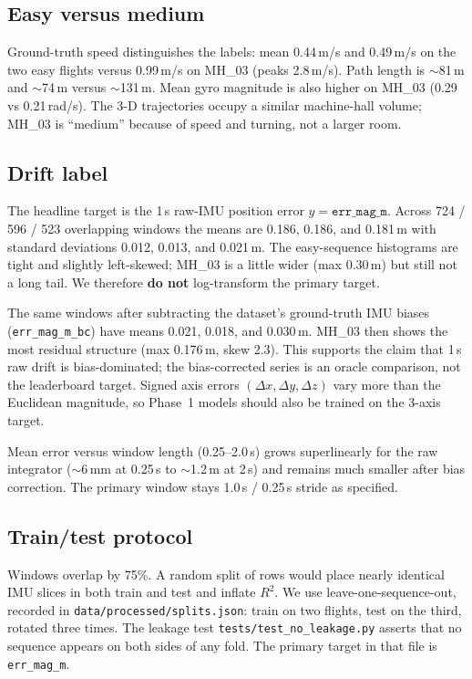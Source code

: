 \subsection{Easy versus medium}
Ground-truth speed distinguishes the labels: mean 0.44\,m/s and
0.49\,m/s on the two easy flights versus 0.99\,m/s on MH\_03 (peaks
2.8\,m/s). Path length is $\sim$81\,m and $\sim$74\,m versus $\sim$131\,m.
Mean gyro magnitude is also higher on MH\_03 (0.29 vs 0.21\,rad/s).
The 3-D trajectories occupy a similar machine-hall volume; MH\_03 is
``medium'' because of speed and turning, not a larger room.

\subsection{Drift label}
The headline target is the 1\,s raw-IMU position error $y=\texttt{err\_mag\_m}$.
Across 724 / 596 / 523 overlapping windows the means are 0.186, 0.186,
and 0.181\,m with standard deviations 0.012, 0.013, and 0.021\,m.
The easy-sequence histograms are tight and slightly left-skewed; MH\_03
is a little wider (max 0.30\,m) but still not a long tail. We therefore
\textbf{do not} log-transform the primary target.

The same windows after subtracting the dataset's ground-truth IMU biases
(\texttt{err\_mag\_m\_bc}) have means 0.021, 0.018, and 0.030\,m. MH\_03
then shows the most residual structure (max 0.176\,m, skew 2.3). This
supports the claim that 1\,s raw drift is bias-dominated; the
bias-corrected series is an oracle comparison, not the leaderboard
target. Signed axis errors $({\Delta}x,{\Delta}y,{\Delta}z)$ vary more
than the Euclidean magnitude, so Phase~1 models should also be trained
on the 3-axis target.

Mean error versus window length (0.25--2.0\,s) grows superlinearly for
the raw integrator ($\sim$6\,mm at 0.25\,s to $\sim$1.2\,m at 2\,s) and
remains much smaller after bias correction. The primary window stays
1.0\,s / 0.25\,s stride as specified.

\subsection{Train/test protocol}
Windows overlap by 75\%. A random split of rows would place nearly
identical IMU slices in both train and test and inflate $R^2$. We use
leave-one-sequence-out, recorded in \texttt{data/processed/splits.json}:
train on two flights, test on the third, rotated three times. The
leakage test \texttt{tests/test\_no\_leakage.py} asserts that no
sequence appears on both sides of any fold. The primary target in that
file is \texttt{err\_mag\_m}.
